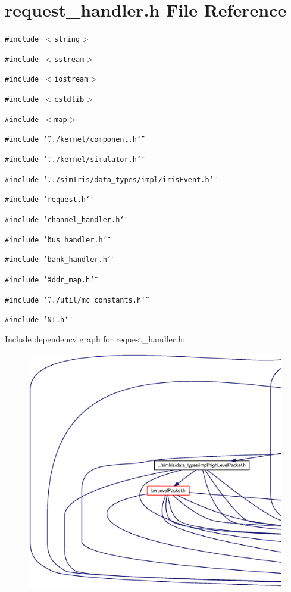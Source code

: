\section{request\_\-handler.h File Reference}
\label{request__handler_8h}
{\tt \#include $<$string$>$}\par
{\tt \#include $<$sstream$>$}\par
{\tt \#include $<$iostream$>$}\par
{\tt \#include $<$cstdlib$>$}\par
{\tt \#include $<$map$>$}\par
{\tt \#include \char`\"{}../kernel/component.h\char`\"{}}\par
{\tt \#include \char`\"{}../kernel/simulator.h\char`\"{}}\par
{\tt \#include \char`\"{}../simIris/data\_\-types/impl/irisEvent.h\char`\"{}}\par
{\tt \#include \char`\"{}request.h\char`\"{}}\par
{\tt \#include \char`\"{}channel\_\-handler.h\char`\"{}}\par
{\tt \#include \char`\"{}bus\_\-handler.h\char`\"{}}\par
{\tt \#include \char`\"{}bank\_\-handler.h\char`\"{}}\par
{\tt \#include \char`\"{}addr\_\-map.h\char`\"{}}\par
{\tt \#include \char`\"{}../util/mc\_\-constants.h\char`\"{}}\par
{\tt \#include \char`\"{}NI.h\char`\"{}}\par


Include dependency graph for request\_\-handler.h:\nopagebreak
\begin{figure}[H]
\begin{center}
\leavevmode
\includegraphics[width=420pt]{request__handler_8h__incl}
\end{center}
\end{figure}


